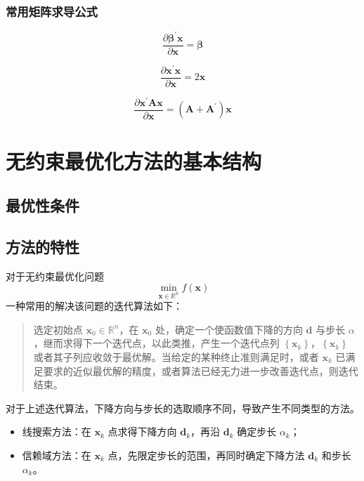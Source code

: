 \documentclass[cn]{elegantbook}
\begin{document}
\subsection{常用矩阵求导公式}

\begin{equation}
    \frac{\partial\boldsymbol{\beta}^{\prime}\mathbf{x}}{\partial\mathbf{x}}=\boldsymbol{\beta}
\end{equation}

\begin{equation}
    \frac{\partial\mathbf{x}^{\prime}\mathbf{x}}{\partial\mathbf{x}}=2\mathbf{x}
\end{equation}

\begin{equation}
    \frac{\partial\mathbf{x}^{\prime}\mathbf{A}\mathbf{x}}{\partial\mathbf{x}}=\left(\mathbf{A}+\mathbf{A}^{\prime}\right)\mathbf{x}
\end{equation}

\chapter{无约束最优化方法的基本结构}

\section{最优性条件}

\section{方法的特性}

对于无约束最优化问题
\begin{equation}
    \min_{\mathbf{x}\in\mathbb{R}^{n}}f\left(\mathbf{x}\right)
\end{equation}
一种常用的解决该问题的迭代算法如下：
\begin{quotation}
    选定初始点 $\mathbf{x}_{0}\in\mathbb{R}^{n}$，在 $\mathbf{x}_{0}$ 处，确定一个使函数值下降的方向 $\mathbf{d}$ 与步长 $\alpha$，继而求得下一个迭代点，以此类推，产生一个迭代点列 $\left\{\mathbf{x}_{k}\right\}$，$\left\{\mathbf{x}_{k}\right\}$ 或者其子列应收敛于最优解。当给定的某种终止准则满足时，或者 $\mathbf{x}_{k}$ 已满足要求的近似最优解的精度，或者算法已经无力进一步改善迭代点，则迭代结束。
\end{quotation}
\begin{remark}
    对于上述迭代算法，下降方向与步长的选取顺序不同，导致产生不同类型的方法。
    \begin{itemize}
        \item 线搜索方法：在 $\mathbf{x}_{k}$ 点求得下降方向 $\mathbf{d}_{k}$，再沿 $\mathbf{d}_{k}$ 确定步长 $\alpha_{k}$；
        \item 信赖域方法：在 $\mathbf{x}_{k}$ 点，先限定步长的范围，再同时确定下降方法 $\mathbf{d}_{k}$ 和步长 $\alpha_{k}$。
    \end{itemize}
\end{remark}
\end{document}
